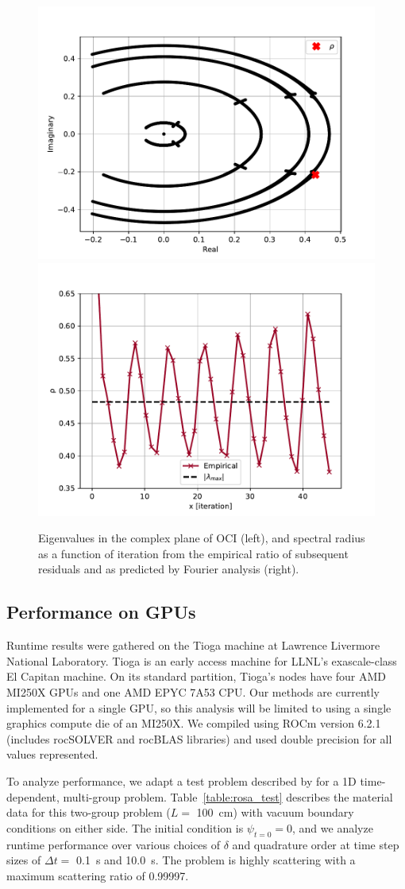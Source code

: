 \begin{figure}
    \centering
    \includegraphics[width=.49\textwidth]{figures/therefore_figs/eig_plot.pdf}
    \includegraphics[width=.49\textwidth]{figures/therefore_figs/eig_spec_rad.pdf}
    \caption{Eigenvalues in the complex plane of OCI (left), and spectral radius as a function of iteration from the empirical ratio of subsequent residuals and as predicted by Fourier analysis (right).}
    \label{fig:eigplot}
\end{figure}

\subsection{Performance on GPUs}

Runtime results were gathered on the Tioga machine at Lawrence Livermore National Laboratory.
Tioga is an early access machine for LLNL's exascale-class El Capitan machine.
On its standard partition, Tioga's nodes have four AMD MI250X GPUs and one AMD EPYC 7A53 CPU.
Our methods are currently implemented for a single GPU, so this analysis will be limited to using a single graphics compute die of an MI250X.
We compiled using ROCm version 6.2.1 (includes rocSOLVER and rocBLAS libraries) and used double precision for all values represented.

To analyze performance, we adapt a test problem described by \cite{rosa_cellwise_2013} for a 1D time-dependent, multi-group problem.
Table~\ref{table:rosa_test} describes the material data for this 
two-group problem ($L=$ \SI{100}{\centi\meter}) with vacuum boundary conditions on either side. 
The initial condition is $\psi_{t=0} = 0$, and we analyze runtime performance over various choices of $\delta$ and quadrature order at time step sizes of $\Delta t=$ \SI{0.1}{\s} and \SI{10.0}{\s}.
The problem is highly scattering with a maximum scattering ratio of \num{0.99997}.



